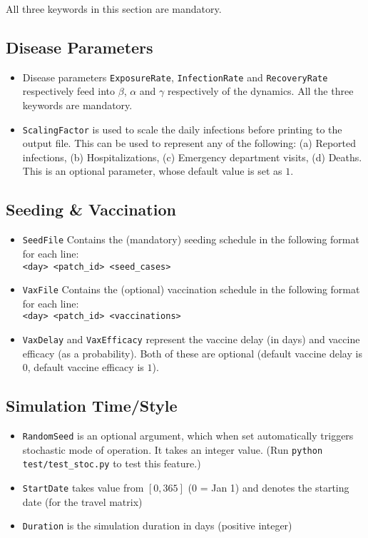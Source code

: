 \documentclass[10pt]{scrartcl}
\theoremstyle{definition}
\begin{document}
All three keywords in this section are mandatory.


\subsection{Disease Parameters}
\begin{itemize}
	\item Disease parameters \verb|ExposureRate|, \verb|InfectionRate| and 
	\verb|RecoveryRate| respectively feed into $\beta$, $\alpha$ and $\gamma$ 
	respectively of the dynamics. All the three keywords are mandatory.
	
	\item \verb|ScalingFactor| is used to scale the daily infections before 
	printing to the output file. This can be used to represent any of the 
	following: (a) Reported infections, (b) Hospitalizations, (c) Emergency 
	department visits, (d) Deaths. This is an optional parameter, whose default 
	value is set as $1$.
\end{itemize}

\subsection{Seeding \& Vaccination}
\begin{itemize}
	\item \verb|SeedFile| Contains the (mandatory) seeding schedule in the 
	following format for each line:\\
	\verb|<day> <patch_id> <seed_cases>|
	
	\item \verb|VaxFile| Contains the (optional) vaccination schedule in the 
	following format for each line:\\
	\verb|<day> <patch_id> <vaccinations>|
	
	\item \verb|VaxDelay| and \verb|VaxEfficacy| represent the vaccine delay 
	(in days) and vaccine efficacy (as a probability). Both of these are 
	optional (default vaccine delay is $0$, default vaccine efficacy is $1$). 
	
\end{itemize}

\subsection{Simulation Time/Style}

\begin{itemize}
	\item \verb|RandomSeed| is an optional argument, which 
	when set automatically triggers stochastic mode of operation. It takes an 
	integer value. (Run \verb|python test/test_stoc.py| to test this feature.)
	
	\item \verb|StartDate| takes value from $[0,365]$ (0 = Jan 1) and denotes 
	the starting date (for the travel matrix)
	
	\item \verb|Duration| is the simulation duration in days (positive integer)
\end{itemize}
\end{document}
